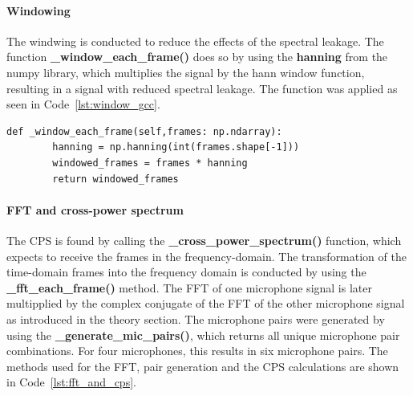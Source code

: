     \paragraph{Windowing}
    The windwing is conducted to reduce the effects of the spectral leakage. The function \textbf{\_window\_each\_frame()} does so by using the \textbf{hanning} from the numpy library, which multiplies the signal by the hann window function, resulting in a signal with reduced spectral leakage. The function was applied as seen in Code~\ref{lst:window_gcc}.\\

    \begin{lstlisting}[style=pythonstyle, caption={Function used for windowing the signal.}, label={lst:window_gcc}]
    def _window_each_frame(self,frames: np.ndarray):
        hanning = np.hanning(int(frames.shape[-1]))
        windowed_frames = frames * hanning
        return windowed_frames
    \end{lstlisting}
    
    \paragraph{FFT and cross-power spectrum}
    The CPS is found by calling the \textbf{\_cross\_power\_spectrum()} function, which expects to receive the frames in the frequency-domain. The transformation of the time-domain frames into the frequency domain is conducted by using the \textbf{\_fft\_each\_frame()} method. The FFT of one microphone signal is later multipplied by the complex conjugate of the FFT of the other microphone signal as introduced in the theory section. The microphone pairs were generated by using the \textbf{\_generate\_mic\_pairs()}, which returns all unique microphone pair combinations. For four microphones, this results in six microphone pairs. The methods used for the FFT, pair generation and the CPS calculations are shown in Code~\ref{lst:fft_and_cps}.\\

